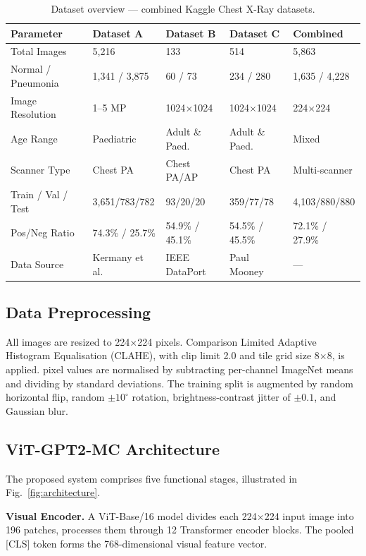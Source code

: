 \documentclass{jcst}
\begin{document}
\begin{table}[t]
\caption{\label{tab:datasets}Dataset overview --- combined Kaggle Chest X-Ray datasets.}
\centering
\small
\renewcommand{\arraystretch}{1.2}
\begin{tabularx}{\textwidth}{L{3.5cm} Z Z Z Z}
\toprule
\textbf{Parameter} & \textbf{Dataset A} & \textbf{Dataset B} & \textbf{Dataset C} & \textbf{Combined} \\
\midrule
Total Images & 5,216 & 133 & 514 & 5,863 \\
Normal / Pneumonia & 1,341 / 3,875 & 60 / 73 & 234 / 280 & 1,635 / 4,228 \\
Image Resolution & 1--5 MP & 1024$\times$1024 & 1024$\times$1024 & 224$\times$224 \\
Age Range & Paediatric & Adult \& Paed. & Adult \& Paed. & Mixed \\
Scanner Type & Chest PA & Chest PA/AP & Chest PA & Multi-scanner \\
Train / Val / Test & 3,651/783/782 & 93/20/20 & 359/77/78 & 4,103/880/880 \\
Pos/Neg Ratio & 74.3\% / 25.7\% & 54.9\% / 45.1\% & 54.5\% / 45.5\% & 72.1\% / 27.9\% \\
Data Source & Kermany et al. & IEEE DataPort & Paul Mooney & --- \\
\bottomrule
\end{tabularx}
\end{table}

\subsection{Data Preprocessing}

All images are resized to 224$\times$224 pixels. Comparison Limited
Adaptive Histogram Equalisation (CLAHE), with clip limit 2.0 and tile grid size 8$\times$8, is
applied. pixel values are normalised by subtracting per-channel ImageNet means and 
dividing by standard deviations. The training split is augmented by random horizontal 
flip, random $\pm10^{\circ}$ rotation, brightness-contrast jitter of $\pm0.1$, and Gaussian blur.

\subsection{ViT-GPT2-MC Architecture}

The proposed system comprises five functional stages, illustrated in Fig.~\ref{fig:architecture}.

\textbf{Visual Encoder.} A ViT-Base/16 model divides each 224$\times$224 input image into 
196 patches, processes them through 12 Transformer encoder blocks. The pooled [CLS] token 
forms the 768-dimensional visual feature vector.
\end{document}
